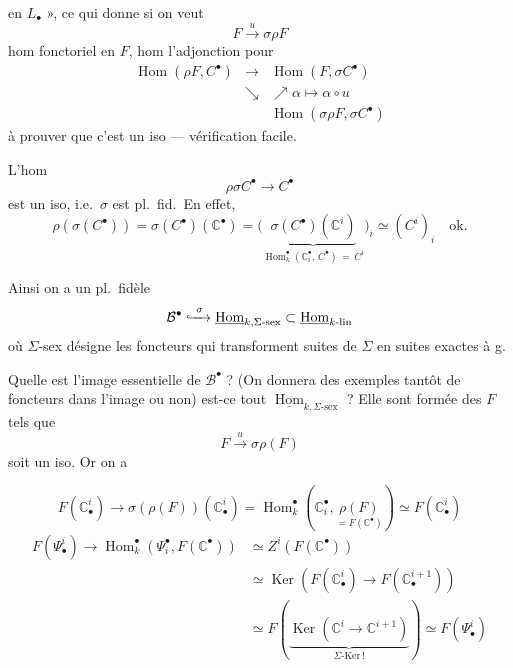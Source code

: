 \documentclass[11pt,a4paper]{article}
\begin{document}
en $L_{\bullet}$ », ce qui donne si on veut
\[
F \xrightarrow{\ u\ } \sigma\rho F
\]
hom fonctoriel en $F$, \struck{\ill{}}  \struck{\ill{}} hom
\ill{} l'adjonction pour 
\[
\begin{array}{ccc}
\operatorname{Hom}(\rho F, C^{\bullet}) & \longrightarrow & \operatorname{Hom}(F, \sigma C^{\bullet}) \\
& \searrow & \nearrow{\scriptstyle \alpha \mapsto \alpha \circ u} \\
& & \operatorname{Hom}(\sigma\rho F, \sigma C^{\bullet})
\end{array}
\]
à prouver que c'est un iso --- vérification facile.

L'hom 
\[
\rho\sigma C^{\bullet} \longrightarrow C^{\bullet}
\]
est un iso, i.e.\ $\sigma$ est pl.\ fid.\ En effet,
\[
\rho(\sigma(C^{\bullet})) = \sigma(C^{\bullet})(\mathbb{C}^{\bullet}) = \bigl(\underbrace{\sigma(C^{\bullet})(\mathbb{C}^i)}_{\operatorname{Hom}^{\bullet}_k(\mathbb{C}^{\bullet}_i,\, C^{\bullet}) \,=\, C^i}\bigr)_i \simeq (C^i)_i \quad \text{ok.}
\]

Ainsi on a un \ill{} \ill{} pl.\ fidèle
\[
\mathcal{B}^{\bullet} \xhookrightarrow{\ \sigma\ } \underline{\operatorname{Hom}}_{k, \Sigma\text{-sex}} \subset \underline{\operatorname{Hom}}_{k\text{-lin}}
\]
où $\Sigma$-sex désigne les foncteurs qui transforment suites de $\Sigma$ en suites exactes à g.

Quelle est l'image essentielle de $\mathcal{B}^{\bullet}$ ?
(On donnera des exemples tantôt de foncteurs dans l'image ou non) est-ce tout
$\underline{\operatorname{Hom}}_{k, \Sigma\text{-sex}}$ ? Elle sont formée des $F$ tels que
\[
F \xrightarrow{\ u\ } \sigma\rho(F)
\]
soit un iso. Or on a

\[
F(\mathbb{C}^i_{\bullet}) \to \sigma(\rho(F))(\mathbb{C}^i_{\bullet}) = \operatorname{Hom}^{\bullet}_k(\mathbb{C}^{\bullet}_i, \underset{= F(\mathbb{C}^{\bullet})}{\rho(F)}) \simeq F(\mathbb{C}^i_{\bullet})
\]
\[
\begin{aligned}
F(\Psi^i_{\bullet}) \to \operatorname{Hom}^{\bullet}_k(\Psi^{\bullet}_i, F(\mathbb{C}^{\bullet})) &\simeq Z^i(F(\mathbb{C}^{\bullet})) \\
&\simeq \operatorname{Ker}(F(\mathbb{C}^i_{\bullet}) \to F(\mathbb{C}^{i+1}_{\bullet})) \\
&\simeq F(\underbrace{\operatorname{Ker}(\mathbb{C}^i \to \mathbb{C}^{i+1})}_{\Sigma\text{-Ker}\,!}) \simeq F(\Psi^i_{\bullet})
\end{aligned}
\]
\end{document}

